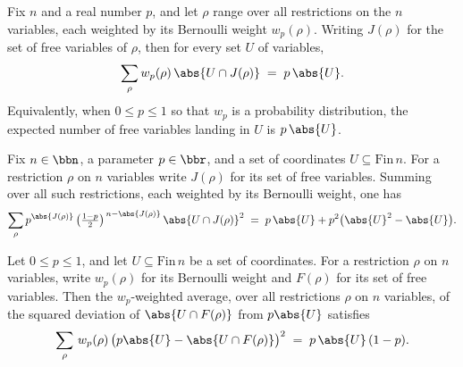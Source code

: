 \begin{lemma}
\label{RestrictionFourier.expectation_card_inter}
\leanok
{}
Fix $n$ and a real number $p$, and let $\rho$ range over all restrictions on the $n$
variables, each weighted by its Bernoulli weight $w_p(\rho)$. Writing $J(\rho)$ for the
set of free variables of $\rho$, then for every set $U$ of variables,
\[
  \sum_{\rho} w_p(\rho)\,\abs{U \cap J(\rho)} \;=\; p\,\abs{U}.
\]
Equivalently, when $0 \le p \le 1$ so that $w_p$ is a probability distribution, the
expected number of free variables landing in $U$ is $p\,\abs{U}$.
\end{lemma}

\begin{lemma}
\label{RestrictionFourier.expectation_card_inter_sq}
\leanok
{}
Fix $n \in \bbn$, a parameter $p \in \bbr$, and a set of coordinates $U \subseteq
\mathrm{Fin}\,n$. For a restriction $\rho$ on $n$ variables write $J(\rho)$ for its set
of free variables. Summing over all such restrictions, each weighted by its Bernoulli
weight, one has
\[
\sum_{\rho} p^{\abs{J(\rho)}}\left(\tfrac{1-p}{2}\right)^{\,n - \abs{J(\rho)}} \abs{U
\cap J(\rho)}^2
  \;=\; p\,\abs{U} + p^2\bigl(\abs{U}^2 - \abs{U}\bigr).
\]
\end{lemma}

\begin{lemma}
\label{RestrictionFourier.variance_card_inter}
\leanok
{}
Let $0 \le p \le 1$, and let $U \subseteq \mathrm{Fin}\,n$ be a set of coordinates. For
a restriction $\rho$ on $n$ variables, write $w_p(\rho)$ for its Bernoulli weight and
$F(\rho)$ for its set of free variables. Then the $w_p$-weighted average, over all
restrictions $\rho$ on $n$ variables, of the squared deviation of $\abs{U \cap F(\rho)}$
from $p\abs{U}$ satisfies
\[
\sum_{\rho}\, w_p(\rho)\,\bigl(p\abs{U} - \abs{U \cap F(\rho)}\bigr)^2 \;=\;
p\,\abs{U}\,(1 - p).
\]
\end{lemma}

